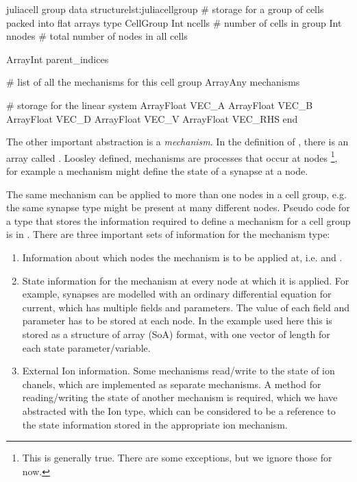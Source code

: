 \begin{inlinelisting}{julia}{cell group data structure}{lst:juliacellgroup}
# storage for a group of cells packed into flat arrays
type CellGroup
  Int ncells    # number of cells in group
  Int nnodes    # total number of nodes in all cells

  Array{Int} parent_indices

  # list of all the mechanisms for this cell group
  Array{Any} mechanisms

  # storage for the linear system
  Array{Float} VEC_A
  Array{Float} VEC_B
  Array{Float} VEC_D
  Array{Float} VEC_V
  Array{Float} VEC_RHS
end
\end{inlinelisting}

The other important abstraction is a \emph{mechanism}. In the definition of , there is an array called . Loosley defined, mechanisms are processes that occur at nodes \footnote{This is generally true. There are some exceptions, but we ignore those for now.}, for example a mechanism might define the state of a synapse at a node.

The same mechanism can be applied to more than one nodes in a cell group, e.g. the same synapse type might be present at many different nodes. Pseudo code for a type that stores the information required to define a mechanism for a cell group is in .  There are three important sets of information for the mechanism type:
\begin{enumerate}
    \item
        Information about which nodes the mechanism is to be applied at, i.e.  and .
    \item
        State information for the mechanism at every node at which it is applied. For example, synapses are modelled with an ordinary differential equation for current, which has multiple fields and parameters. The value of each field and parameter has to be stored at each node. In the example used here this is stored as a structure of array (SoA) format, with one vector of length  for each state parameter/variable.
    \item
        External Ion information.
        Some mechanisms read/write to the state of ion chanels, which are implemented as separate mechanisms.
        A method for reading/writing the state of another mechanism is required, which we have abstracted with the Ion type, which can be considered to be a reference to the state information stored in the appropriate ion mechanism.
\end{enumerate}

